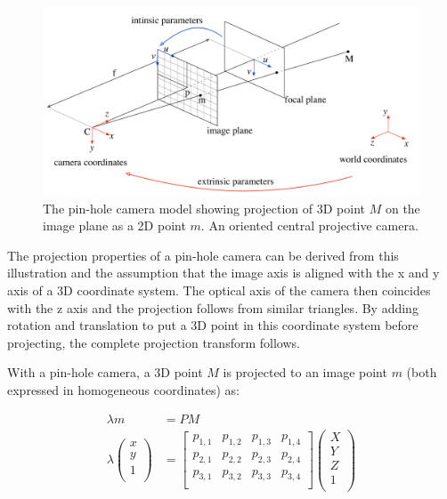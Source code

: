 \begin{figure}[ht]
	\begin{center}
		\includegraphics[keepaspectratio,width=\textwidth]{fig/camera-model.pdf}
	\end{center}
	\caption{The pin-hole camera model showing projection of 3D point $M$ on the image plane as a 2D point $m$. An oriented central projective camera.}
	\label{fig:cameramodel}
\end{figure}

The projection properties of a pin-hole camera can be derived from this illustration and the assumption that the image axis is aligned with the x and y axis of a 3D coordinate system. The optical axis of the camera then coincides with the z axis and the projection follows from similar triangles. By adding rotation and translation to put a 3D point in this coordinate system before projecting, the complete projection transform follows.

With a pin-hole camera, a 3D point $M$ is projected to an image point $m$ (both expressed in homogeneous coordinates) as:

\begin{equation}
  \begin{aligned}
	\lambda m&= PM \\
	\lambda
	\begin{pmatrix}
		x \\
		y \\
		1 \\
	\end{pmatrix}
	&=
	\begin{bmatrix}
		p_{1,1} & p_{1,2} & p_{1,3}  & p_{1,4} \\
		p_{2,1} & p_{2,2} & p_{2,3}  & p_{2,4} \\
		p_{3,1} & p_{3,2} & p_{3,3}  & p_{3,4} \\
	\end{bmatrix}
	\begin{pmatrix}
		X \\
		Y \\
		Z \\
		1 \\
	\end{pmatrix}
	\end{aligned}
	\label{eq:point-projection}
\end{equation}

